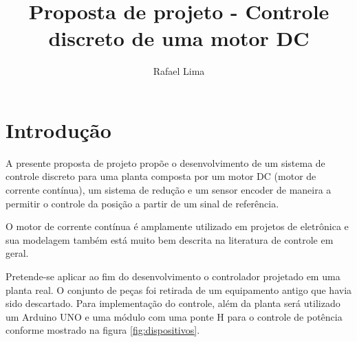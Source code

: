 \documentclass[a4paper,11pt]{article}
\title{Proposta de projeto - Controle discreto de uma motor DC} %
\author{Rafael Lima}
\begin{document}

\section{Introdução}

A presente proposta de projeto propõe o desenvolvimento de um sistema de controle discreto para uma planta composta por um motor DC (motor de corrente contínua), um sistema de redução e um sensor encoder de maneira a permitir o controle da posição a partir de um sinal de referência.

O motor de corrente contínua é amplamente utilizado em projetos de eletrônica e sua modelagem também está muito bem descrita na literatura de controle em geral. 

Pretende-se aplicar ao fim do desenvolvimento o controlador projetado em uma planta real. O conjunto de peças foi retirada de um equipamento antigo que havia sido descartado. Para implementação do controle, além da planta será utilizado um Arduino UNO e uma módulo com uma ponte H para o controle de potência conforme mostrado na figura \ref{fig:dispositivos}.
\end{document}
